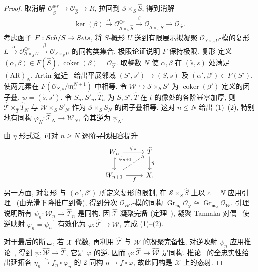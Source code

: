 \begin{proof}
取消解 $\mathcal O_{\widehat S}^{\oplus r}\to\mathcal O_{\widehat S}\to R$, 拉回到 $\mathcal S\times_S\widehat S$, 得到消解
\begin{align}\label{src:7.7.21}
\ker(\beta)\xrightarrow\alpha\mathcal O_{\mathcal S\times_S\widehat S}^{\oplus r}\xrightarrow\beta\mathcal O_{\mathcal S\times_S\widehat S}\longrightarrow\mathcal O_{\widehat{\mathcal T}}.
\end{align}
考虑函子 $F:Sch/S\to Sets$, 将 $S$-概形 $U$ 送到有限展示拟凝聚 $\mathcal O_{\mathcal S\times_SU}$-模的复形 $L\xrightarrow\alpha\mathcal O_{\mathcal S\times_SU}^{\oplus r}\xrightarrow\beta\mathcal O_{\mathcal S\times_SU}$ 的同构类集合. 极限论证说明 $F$ 保持极限. 复形  定义 $(\alpha,\beta)\in F(\widehat S)$, $\operatorname{coker}(\beta)=\mathcal O_{\widehat{\mathcal T}}$. 取整数 $N$ 使 $\alpha,\beta$ 在 $(\widetilde s,s)$ 处满足 $(\mathrm{AR})_N$. Artin 逼近~ 给出平展邻域 $(S',s')\to(S,s)$ 及 $(\alpha',\beta')\in F(S')$, 使两元素在 $F(\mathcal O_{S,s}/\mathfrak m_s^{N+1})$ 中相等. 令 $\mathcal W\hookrightarrow\mathcal S\times_SS'$ 为 $\operatorname{coker}(\beta')$ 定义的闭子叠, $w=(\widetilde s,s')$. 令 $S_n,S'_n,\widehat T_n$ 为 $S,S',\widehat T$ 在 $t$ 的像处的各阶幂零加厚, 则 $\widehat{\mathcal T}\times_{\widehat T}\widehat T_N$ 与 $\mathcal W\times_SS'_N$ 作为 $\mathcal S\times_SS_N$ 的闭子叠相等. 这对 $n\le N$ 给出 (1)--(2), 特别地有同构 $\varphi_N:\widehat{\mathcal T}_N\to\mathcal W_N$, 令其逆为 $\psi_N$.

由 $\eta$ 形式泛, 可对 $n\ge N$ 逐阶寻找相容提升
\begin{align*}
\begin{tikzcd}[ampersand replacement=\&]
\mathcal W_n\arrow[r,"{\psi_n}"]\arrow[d,hook]\&\widehat{\mathcal T}\arrow[d,"{\eta}"]\\
\mathcal W_{n+1}\arrow[r,"{f}"']\arrow[ur,dashed,"{\psi_{n+1}}"]\&\mathcal X.
\end{tikzcd}
\end{align*}
另一方面, 对复形  与 $(\alpha',\beta')$ 所定义复形的限制, 在 $\mathcal S\times_S\widehat S$ 上以 $c=N$ 应用引理~ (由光滑下降推广到叠), 得到分次 $\mathcal O_{BG}$-模的同构 $\operatorname{Gr}_{\mathfrak m_t}\mathcal O_{\widehat{\mathcal T}}\cong\operatorname{Gr}_{\mathfrak m_w}\mathcal O_{\mathcal W}$. 引理~ 说明所有 $\psi_n:\mathcal W_n\to\widehat{\mathcal T}_n$ 是同构. 因 $\widehat{\mathcal T}$ 凝聚完备 (定理~), 凝聚 Tannaka 对偶~ 使逆映射 $\varphi_n=\psi_n^{-1}$ 有效化为 $\varphi:\widehat{\mathcal T}\to\mathcal W$, 完成 (1)--(2).

对于最后的断言, 若 $\mathcal X$ 代数, 再利用 $\widehat{\mathcal T}$ 与 $\mathcal W$ 的凝聚完备性, 对逆映射 $\psi_n$ 应用推论~, 得到 $\psi:\widehat{\mathcal W}\to\widehat{\mathcal T}$, 它是 $\varphi$ 的逆. 因而 $\varphi:\widehat{\mathcal T}\to\widehat{\mathcal W}$ 是同构. 推论~ 的全忠实性给出延拓各 $\eta_n\xrightarrow{\sim}f_n\circ\varphi_n$ 的 $2$-同构 $\eta\to f\circ\varphi$, 故此同构是 $\mathcal X$ 上的态射.
\end{proof}

